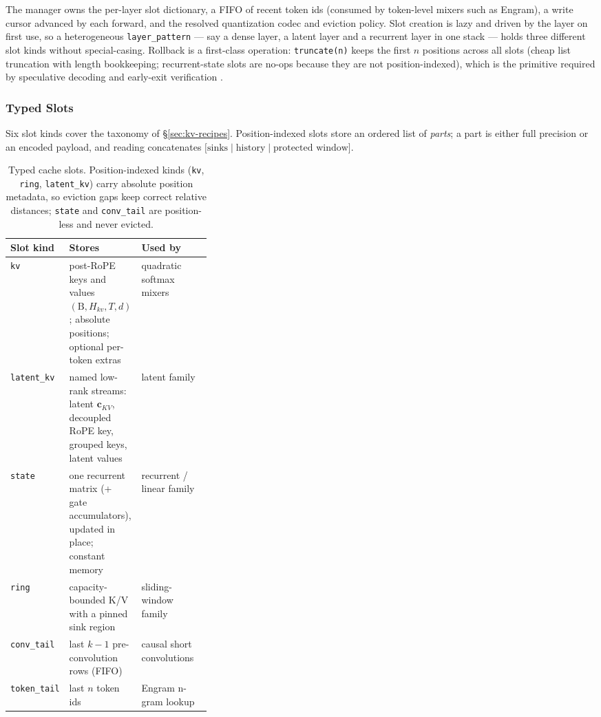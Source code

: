 The manager owns the per-layer slot dictionary, a FIFO of recent token ids (consumed by token-level mixers such as Engram), a write cursor advanced by each forward, and the resolved quantization codec and eviction policy. Slot creation is lazy and driven by the layer on first use, so a heterogeneous \texttt{layer\_pattern} --- say a dense layer, a latent layer and a recurrent layer in one stack --- holds three different slot kinds without special-casing. Rollback is a first-class operation: \texttt{truncate(n)} keeps the first $n$ positions across all slots (cheap list truncation with length bookkeeping; recurrent-state slots are no-ops because they are not position-indexed), which is the primitive required by speculative decoding and early-exit verification \citep{layerskip_elhoushi_2024}.

\subsubsection{Typed Slots}

Six slot kinds cover the taxonomy of \S\ref{sec:kv-recipes}. Position-indexed slots store an ordered list of \emph{parts}; a part is either full precision or an encoded payload, and reading concatenates $\big[\text{sinks} \mid \text{history} \mid \text{protected window}\big]$.

\begin{table}[H]
\centering
\small
\begin{tabularx}{0.98\linewidth}{l L{0.34\linewidth} X}
\toprule
\textbf{Slot kind} & \textbf{Stores} & \textbf{Used by} \\
\midrule
\texttt{kv} & post-RoPE keys and values $(\text{B},H_{kv},T,d)$; absolute positions; optional per-token extras & quadratic softmax mixers \\
\texttt{latent\_kv} & named low-rank streams: latent $\mathbf{c}_{KV}$, decoupled RoPE key, grouped keys, latent values & latent family \\
\texttt{state} & one recurrent matrix (+ gate accumulators), updated in place; constant memory & recurrent / linear family \\
\texttt{ring} & capacity-bounded K/V with a pinned sink region & sliding-window family \\
\texttt{conv\_tail} & last $k-1$ pre-convolution rows (FIFO) & causal short convolutions \\
\texttt{token\_tail} & last $n$ token ids & Engram n-gram lookup \\
\bottomrule
\end{tabularx}
\caption{Typed cache slots. Position-indexed kinds (\texttt{kv}, \texttt{ring}, \texttt{latent\_kv}) carry absolute position metadata, so eviction gaps keep correct relative distances; \texttt{state} and \texttt{conv\_tail} are position-less and never evicted.}
\label{tab:kv-slots}
\end{table}

